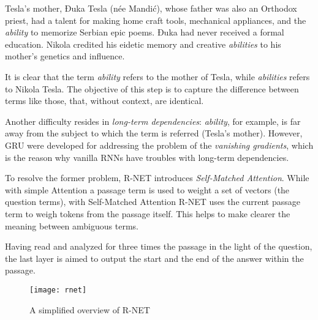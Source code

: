 \begin{enumerate}
  \begin{displayquote}
  Tesla’s mother, Đuka Tesla (née Mandić), whose father was also an Orthodox priest, had a talent for making home craft tools, mechanical appliances, and the \textit{ability} to memorize Serbian epic poems. Đuka had never received a formal education. Nikola credited his eidetic memory and creative \textit{abilities} to his mother’s genetics and influence.
  \end{displayquote}
  
  It is clear that the term \textit{ability} refers to the mother of Tesla, while \textit{abilities} refers to Nikola Tesla. The objective of this step is to capture the difference between terms like those, that, without context, are identical.
  
  Another difficulty resides in \textit{long-term dependencies}: \textit{ability}, for example, is far away from the subject to which the term is referred (Tesla's mother). However, GRU \cite{gru} were developed for addressing the problem of the \textit{vanishing gradients}, which is the reason why vanilla RNNs have troubles with long-term dependencies.
  
  To resolve the former problem, R-NET introduces \textit{Self-Matched Attention}. While with simple Attention a passage term is used to weight a set of vectors (the question terms), with Self-Matched Attention R-NET uses the current passage term to weigh tokens from the passage itself. This helps to make clearer the meaning between ambiguous terms.
\end{enumerate}

Having read and analyzed for three times the passage in the light of the question, the last layer is aimed to output the start and the end of the answer within the passage.

\begin{figure}[t]
\centering
\texttt{[image: rnet]}
\caption{A simplified overview of R-NET \cite{imagernetoverview}}
\medskip
\end{figure}
